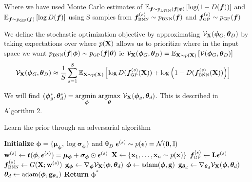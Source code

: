 \documentclass{article}
\begin{document}
Where we have used Monte Carlo estimates of 
$\E _{\bm f \sim \pbnn (\bm f |  \bm \phi ) }  \BB{ \log (1- D(\bm f))  } $ and \\
$\E_{\bm f \sim \pgp (\bm f )}\BB{\log D(\bm f) } $ using S samples from 
$ \bm f ^{(s)}_{ \text{\tiny BNN}} \sim  \pbnn (\bm f)$ and 
$\bm f ^{(s)}_{ \text{\tiny GP}} \sim \pgp (\bm f )$

We define the stochastic optimization objective by approximating 
$ \mathcal V_{ \mathbf{X} } (\bm \phi_G, \bm \theta_D)$ 
by taking expectations over where $p( \mathbf{X} )$ allows us to prioritize where in the input space we want 
$\pbnn (\bm f |  \bm \phi ) \sim \pgp (\bm f | \bm \theta ) $ ie 
$\mathcal V _{ \mathbf{X} } (\bm \phi_G, \bm \theta_D) 
= \mathbb{E} _{ \mathbf{X}  \sim p( \mathbf{X} )} \left[ {\mathcal V (\bm \phi_G, \bm \theta_D)} \right]$
\begin{align}
     \mathcal V _\X (\bm \phi_G, \bm \theta_D)
     &\approx  \frac{1}{S} \sum_{s=1}^S  \E_{\X \sim p(\X)} 
     \BB{\log D (\bm f ^{(s)}_{ \text{\tiny GP}} (\X) ) 
     +\log \bb{ 1-D (\bm f ^{(s)}_{ \text{\tiny BNN}} (\B X) )}  } 
\end{align}

We will find 
$ (\bm \phi ^*_g , \bm \theta ^*_d) =  
\underset{\bm \phi}{\text{argmin }} \underset{\bm \theta }{\text{argmax}}\ \mathcal V _{ \mathbf{X} } (\bm  \phi_g, \bm \theta_d)  $. 
This is described in Algorithm 2. 

\begin{algorithm}
\caption{Learn the prior through an adversarial algorithm}
\begin{algorithmic}[1]
\State \textbf{Initialize} $\bm \phi =\{ \bm \mu _{\bm \phi} , \log \bm \sigma _{\bm \phi}  \}$ 
and $\bm \theta _D$
    \State $ \bm \epsilon ^{(s)} \sim p(\bm \epsilon) = \mathcal{N} ( \mathbf{0} , \mathbb{I}) $
    \State $ \mathbf{w}  ^{(s)} \gets \bm t(\bm \phi, \bm \epsilon^{(s)}) = \bm \mu _{\bm \phi} + \bm \sigma _{\bm \phi} \odot \bm \epsilon ^{(s)}$
    \State $ \mathbf{X}  \gets \{  \mathbf{x} _1, \dots ,  \mathbf{x} _n \sim p( \mathbf{x} )\}$ 
    \State  $\bm f ^{(s)}_{ \text{\tiny GP}} \gets   \B L \bm \epsilon ^{(s)} $ 
    \State $\bm f ^{(s)}_{ \text{\tiny BNN}} \gets   G(\B X ; \B w^{(s)} )$ 
    \State $ \mathbf{g}  _{\bm \phi } \gets \nabla _{\bm \phi } \mathcal V _{ \mathbf{X} } (\bm \phi , \bm \theta_d)  $
    \State $\bm \phi \gets \text{adam}(\bm\phi , \mathbf{g}  )$
    \State $ \mathbf{g}  _{\bm \theta _d} \gets \nabla _{\bm \theta _d } \mathcal V _{ \mathbf{X} } (\bm \phi , \bm \theta_d)  $
    \State $\bm \theta_d \gets \text{adam}(\bm\phi , \mathbf{g} _{\bm \theta _d} )$
\EndWhile
\State \textbf{Return} $\bm \phi^*$
\end{algorithmic}
\end{algorithm}
\end{document}
